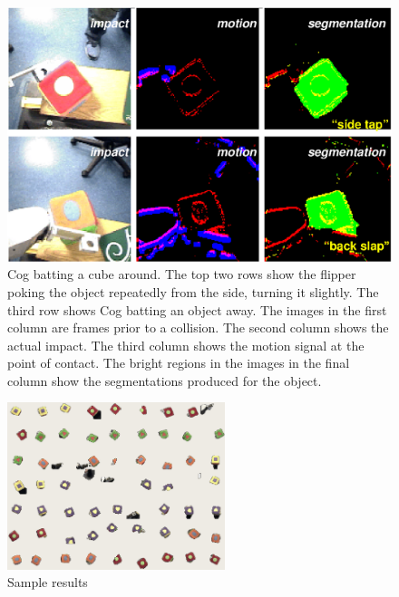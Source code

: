 %
\begin{figure}[tb]
\begin{center}
\includegraphics[width=\columnwidth]{segmentation-detail.eps}
\caption{ 
\label{fig:poking-segmentation}
%
Cog batting a cube around.  The top two rows show the flipper poking
the object repeatedly from the side, turning it slightly.  The third
row shows Cog batting an object away.  The images in the first column
are frames prior to a collision.  The second column shows the actual
impact.  The third column shows the motion signal at the point of
contact.  The bright regions in the images in the final column show
the segmentations produced for the object. 
%
}
\end{center}
\end{figure}
%

\begin{figure}[tbh]
  \centerline{\includegraphics[width=2.5in]{experiment-montage}}
  \caption{Sample results}
  \label{fig:sample-results}
\end{figure}

